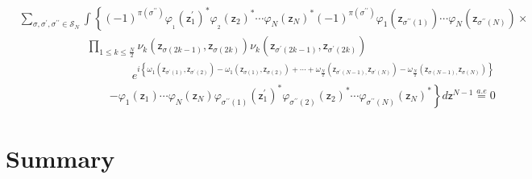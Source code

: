 \documentclass[aps,preprint]{revtex4}%
\begin{document}
\begin{align}
&
{\textstyle\sum\limits_{\sigma,\sigma^{\prime},\sigma^{\prime\prime}%
\in\mathcal{S}_{N}}}
{\displaystyle\int}
\left\{  \left(  -1\right)  ^{\pi\left(  \sigma^{\prime\prime}\right)
}\varphi_{_{1}}\left(  \mathsf{z}_{1}^{\prime}\right)  ^{\ast}\varphi_{_{2}%
}\left(  \mathsf{z}_{2}\right)  ^{\ast}\cdots\varphi_{N}\left(  \mathsf{z}%
_{N}\right)  ^{\ast}\left(  -1\right)  ^{\pi\left(  \sigma^{\prime\prime
}\right)  }\varphi_{1}\left(  \mathsf{z}_{\sigma^{\prime\prime}\left(
1\right)  }\right)  \cdots\varphi_{N}\left(  \mathsf{z}_{\sigma^{\prime\prime
}\left(  N\right)  }\right)  \right.  \times\nonumber\\
&  \qquad\qquad\qquad%
{\displaystyle\prod\limits_{1\leq k\leq\frac{N}{2}}}
\nu_{k}\left(  \mathsf{z}_{\sigma\left(  2k-1\right)  },\mathsf{z}%
_{\sigma\left(  2k\right)  }\right)  \nu_{k}\left(  \mathsf{z}_{\sigma
^{\prime}\left(  2k-1\right)  },\mathsf{z}_{\sigma^{\prime}\left(  2k\right)
}\right) \nonumber\\
&  \qquad\qquad\qquad\qquad\qquad e^{i\left\{  \omega_{1}\left(
\mathsf{z}_{\sigma^{\prime}\left(  1\right)  },\mathsf{z}_{\sigma^{\prime
}\left(  2\right)  }\right)  -\omega_{1}\left(  \mathsf{z}_{\sigma\left(
1\right)  },\mathsf{z}_{\sigma\left(  2\right)  }\right)  +\cdots
+\omega_{\frac{N}{2}}\left(  \mathsf{z}_{\sigma^{\prime}\left(  N-1\right)
,}\mathsf{z}_{\sigma^{\prime}\left(  N\right)  }\right)  -\omega_{\frac{N}{2}%
}\left(  \mathsf{z}_{\sigma\left(  N-1\right)  ,}\mathsf{z}_{\sigma\left(
N\right)  }\right)  \right\}  }\nonumber\\
&  \qquad\qquad\qquad\qquad\left.  -\varphi_{1}\left(  \mathsf{z}_{1}\right)
\cdots\varphi_{N}\left(  \mathsf{z}_{N}\right)  \varphi_{\sigma^{\prime\prime
}\left(  1\right)  }\left(  \mathsf{z}_{1}^{\prime}\right)  ^{\ast}%
\varphi_{\sigma^{\prime\prime}\left(  2\right)  }\left(  \mathsf{z}%
_{2}\right)  ^{\ast}\cdots\varphi_{\sigma^{\prime\prime}\left(  N\right)
}\left(  \mathsf{z}_{N}\right)  ^{\ast}\right\}  d\mathsf{z}^{N-1}%
\overset{a.e}{=}0
\end{align}


\section{Summary\label{summary}}
\end{document}
